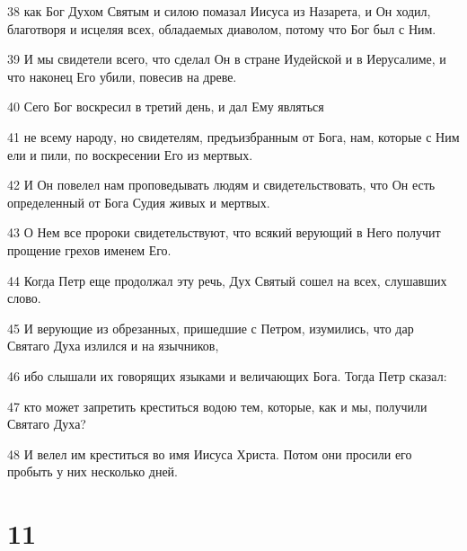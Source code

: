 \par 38 как Бог Духом Святым и силою помазал Иисуса из Назарета, и Он ходил, благотворя и исцеляя всех, обладаемых диаволом, потому что Бог был с Ним.
\par 39 И мы свидетели всего, что сделал Он в стране Иудейской и в Иерусалиме, и что наконец Его убили, повесив на древе.
\par 40 Сего Бог воскресил в третий день, и дал Ему являться
\par 41 не всему народу, но свидетелям, предъизбранным от Бога, нам, которые с Ним ели и пили, по воскресении Его из мертвых.
\par 42 И Он повелел нам проповедывать людям и свидетельствовать, что Он есть определенный от Бога Судия живых и мертвых.
\par 43 О Нем все пророки свидетельствуют, что всякий верующий в Него получит прощение грехов именем Его.
\par 44 Когда Петр еще продолжал эту речь, Дух Святый сошел на всех, слушавших слово.
\par 45 И верующие из обрезанных, пришедшие с Петром, изумились, что дар Святаго Духа излился и на язычников,
\par 46 ибо слышали их говорящих языками и величающих Бога. Тогда Петр сказал:
\par 47 кто может запретить креститься водою тем, которые, как и мы, получили Святаго Духа?
\par 48 И велел им креститься во имя Иисуса Христа. Потом они просили его пробыть у них несколько дней.

\chapter{11}

